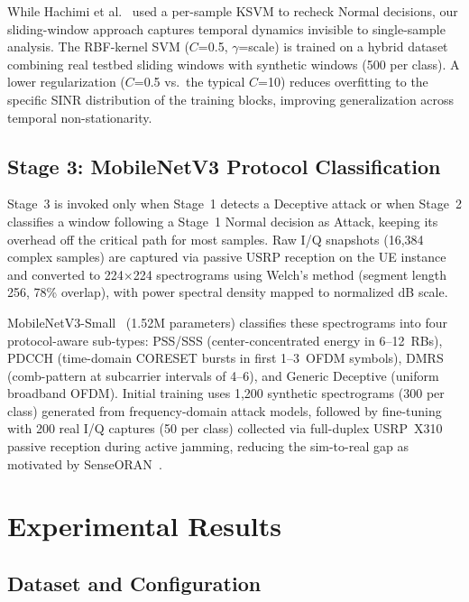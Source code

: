 \documentclass[conference]{IEEEtran}
\begin{document}
While Hachimi et al.~\cite{hachimi2020} used a per-sample KSVM to recheck Normal decisions, our sliding-window approach captures temporal dynamics invisible to single-sample analysis. The RBF-kernel SVM ($C$=0.5, $\gamma$=scale) is trained on a hybrid dataset combining real testbed sliding windows with synthetic windows (500 per class). A lower regularization ($C$=0.5 vs.\ the typical $C$=10) reduces overfitting to the specific SINR distribution of the training blocks, improving generalization across temporal non-stationarity.

\subsection{Stage 3: MobileNetV3 Protocol Classification}

Stage~3 is invoked only when Stage~1 detects a Deceptive attack or when Stage~2 classifies a window following a Stage~1 Normal decision as Attack, keeping its overhead off the critical path for most samples. Raw I/Q snapshots (16,384 complex samples) are captured via passive USRP reception on the UE instance and converted to 224$\times$224 spectrograms using Welch's method (segment length 256, 78\% overlap), with power spectral density mapped to normalized dB scale.

MobileNetV3-Small~\cite{howard2019} (1.52M parameters) classifies these spectrograms into four protocol-aware sub-types: PSS/SSS (center-concentrated energy in 6--12~RBs), PDCCH (time-domain CORESET bursts in first 1--3~OFDM symbols), DMRS (comb-pattern at subcarrier intervals of 4--6), and Generic Deceptive (uniform broadband OFDM). Initial training uses 1,200 synthetic spectrograms (300 per class) generated from frequency-domain attack models, followed by fine-tuning with 200 real I/Q captures (50 per class) collected via full-duplex USRP~X310 passive reception during active jamming, reducing the sim-to-real gap as motivated by SenseORAN~\cite{reusmuns2024}.


\section{Experimental Results}
\label{sec:results}

\subsection{Dataset and Configuration}
\end{document}
